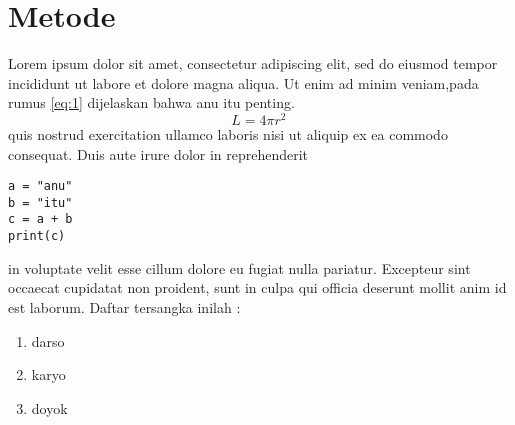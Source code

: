 \chapter{Metode}

Lorem ipsum dolor sit amet, consectetur adipiscing elit, sed do eiusmod tempor incididunt ut labore et dolore magna aliqua. Ut enim ad minim veniam,pada rumus \ref{eq:1} dijelaskan bahwa anu itu penting.
\begin{equation}\label{eq:1}
     L = 4 \pi r^2 \,
\end{equation}
quis nostrud exercitation ullamco laboris nisi ut aliquip ex ea commodo consequat. Duis aute irure dolor in reprehenderit 
\begin{verbatim}
a = "anu"
b = "itu"
c = a + b
print(c) 
\end{verbatim}
in voluptate velit esse cillum dolore eu fugiat nulla pariatur. Excepteur sint occaecat cupidatat non proident, sunt in culpa qui officia deserunt mollit anim id est laborum. Daftar tersangka inilah :
\begin{enumerate}
\item darso
\item karyo
\item doyok
\end{enumerate}